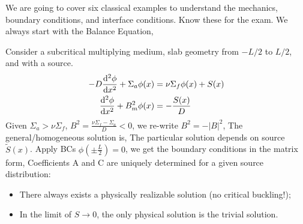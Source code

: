 \documentclass{school-22.211-notes}
\date{March 21, 2012}
\begin{document}
\maketitle

We are going to cover six classical examples to understand the mechanics, boundary conditions, and interface conditions. Know these for the exam. We always start with the Balance Equation,


\clearpage
{} \label{one-group-source-problem-subcritical}
Consider a subcritical multiplying medium, slab geometry from $-L/2$ to $L/2$, and with a source. 
\begin{align}
  - D \frac{\mathrm{d}^{2}\phi}{\mathrm{d}x^{2}} + \Sigma_a \phi(x) &= \nu \Sigma_f \phi(x) + S(x) \\
  \frac{\mathrm{d}^{2}\phi}{\mathrm{d}x^{2}} + B_m^2 \phi(x) &= -\frac{S(x)}{D} 
\end{align}
Given $\Sigma_a > \nu \Sigma_f$, $B^2 = \frac{\nu \Sigma_f - \Sigma_a}{D} < 0 $, we re-write $B^2 = - |B|^2$,
The general/homogeneous solution is,
The particular solution depends on source $\tilde{S}(x)$. Apply BCs $\phi \left( \pm \frac{L}{2} \right) = 0$, we get the boundary conditions in the matrix form,
Coefficients A and C are uniquely determined for a given source distribution: 
\begin{itemize}
\item There always exists a physically realizable solution (no critical buckling!);
\item In the limit of $S\to 0$, the only physical solution is the trivial solution. 
\end{itemize}
\end{document}
